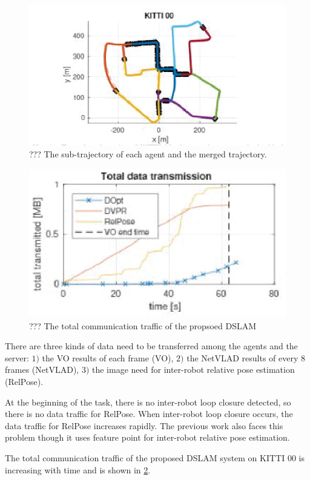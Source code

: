 \begin{figure}[ht]
  \centering  
  \includegraphics[width=0.85\linewidth]{fig/dslam.eps}
  \caption{??? The sub-trajectory of each agent and the merged trajectory.}
  \label{fig:dslam}
\end{figure}

\begin{figure}[thb]
  \centering  
  \includegraphics[width=0.85\linewidth]{fig/data.eps}
  \caption{??? The total communication traffic of the propsoed DSLAM}
  \label{fig:data}
\end{figure}

There are three kinds of data need to be transferred among the agents and the server: $1)$ the VO results of each frame (VO), $2)$ the NetVLAD results of every $8$ frames (NetVLAD), $3)$ the image need for inter-robot relative pose estimation (RelPose).

At the beginning of the task, there is no inter-robot loop closure detected, so there is no data traffic for RelPose. When inter-robot loop closure occurs, the data traffic for RelPose increases rapidly. The previous work\cite{Cieslewski:20187ee} also faces this problem though it uses feature point for inter-robot relative pose estimation.


The total communication traffic of the proposed DSLAM system on KITTI 00 is increasing with time and is shown in \cref{fig:data}.
